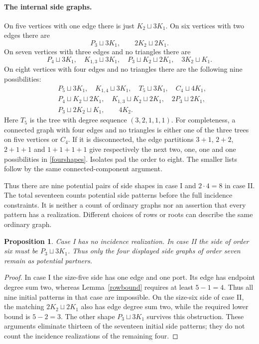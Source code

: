 \documentclass[11pt]{article}
\newtheorem{proposition}[theorem]{Proposition}
\begin{document}
\paragraph{The internal side graphs.}
On five vertices with one edge there is just $K_2\sqcup3K_1$.
On six vertices with two edges there are
\[
 P_3\sqcup3K_1,\qquad 2K_2\sqcup2K_1.
\]
On seven vertices with three edges and no triangles there are
\[
 P_4\sqcup3K_1,\quad K_{1,3}\sqcup3K_1,\quad
 P_3\sqcup K_2\sqcup2K_1,\quad3K_2\sqcup K_1.
\]
On eight vertices with four edges and no triangles there are the following
nine possibilities:
\begin{equation}\label{fourshapes}
\begin{split}
 &P_5\sqcup3K_1,\quad K_{1,4}\sqcup3K_1,\quad T_5\sqcup3K_1,
 \quad C_4\sqcup4K_1,\\
 &P_4\sqcup K_2\sqcup2K_1,\quad K_{1,3}\sqcup K_2\sqcup2K_1,
 \quad2P_3\sqcup2K_1,\\
 &P_3\sqcup2K_2\sqcup K_1,\qquad4K_2.
\end{split}
\end{equation}
Here $T_5$ is the tree with degree sequence $(3,2,1,1,1)$.
For completeness, a connected graph with four edges and no triangles
is either one of the three trees on five vertices or $C_4$. If it is
disconnected, the edge partitions $3+1$, $2+2$, $2+1+1$ and $1+1+1+1$
give respectively the next two, one, one and one possibilities in
\eqref{fourshapes}. Isolates pad the order to eight. The smaller lists
follow by the same connected-component argument.

Thus there are nine potential pairs of side shapes in case I and
$2\cdot4=8$ in case II. The total seventeen counts potential side
patterns before the full incidence constraints. It is
neither a count of ordinary graphs nor an assertion that every pattern
has a realization. Different choices of rows or roots can describe the
same ordinary graph.

\begin{proposition}\label{feasibility}
Case I has no incidence realization. In case II the side of order six
must be $P_3\sqcup3K_1$. Thus only the four displayed side graphs of
order seven remain as potential partners.
\end{proposition}
\begin{proof}
In case I the size-five side has one edge and one port. Its edge has
endpoint degree sum two, whereas Lemma~\ref{rowbound} requires at least
$5-1=4$. Thus all nine initial patterns in that case are impossible.
On the size-six side of case II, the matching $2K_2\sqcup2K_1$ also
has edge degree sum two, while the required lower bound is $5-2=3$.
The other shape $P_3\sqcup3K_1$ survives this obstruction. These arguments
eliminate thirteen of the seventeen initial side patterns; they do not
count the incidence realizations of the remaining four.
\end{proof}
\end{document}
